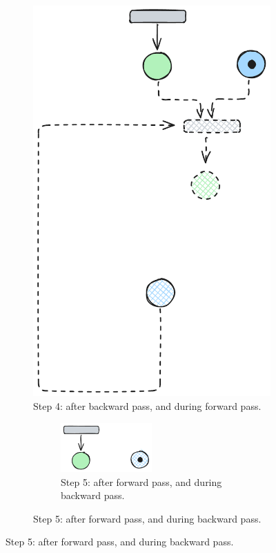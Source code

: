 \begin{figure}[htbp]
\begin{subfigure}[b]{0.23\textwidth}
		\includegraphics[width=\textwidth]{plots/bidirectional_pruning_step_d_forward.pdf}
		\caption{Step 4: after backward pass, and during forward pass.}\label{fig:step:d}
	\end{subfigure}\hfill
	\begin{subfigure}[b]{0.23\textwidth}
		\centering
		\begin{subfigure}[b]{\textwidth}
		\includegraphics[width=0.5\textwidth]{plots/bidirectional_pruning_step_e_backward.pdf}
			\caption{Step 5: after forward pass, and during backward pass.}\label{fig:step:e}
		\end{subfigure}
		

\end{subfigure}
\end{figure}
